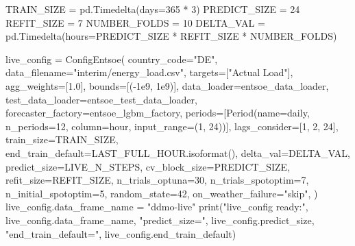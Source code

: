 \documentclass[
  english,
  letterpaper,
]{scrbook}
\newenvironment{Shaded}{\begin{snugshade}}{\end{snugshade}}
\newcommand{\BuiltInTok}[1]{\textcolor[rgb]{0.00,0.23,0.31}{#1}}
\newcommand{\DecValTok}[1]{\textcolor[rgb]{0.68,0.00,0.00}{#1}}
\newcommand{\FloatTok}[1]{\textcolor[rgb]{0.68,0.00,0.00}{#1}}
\newcommand{\NormalTok}[1]{\textcolor[rgb]{0.00,0.23,0.31}{#1}}
\newcommand{\OperatorTok}[1]{\textcolor[rgb]{0.37,0.37,0.37}{#1}}
\newcommand{\StringTok}[1]{\textcolor[rgb]{0.13,0.47,0.30}{#1}}
\begin{document}
\protect{}\label{live-config}
\begin{Shaded}
\begin{Highlighting}[]
\NormalTok{TRAIN\_SIZE }\OperatorTok{=}\NormalTok{ pd.Timedelta(days}\OperatorTok{=}\DecValTok{365} \OperatorTok{*} \DecValTok{3}\NormalTok{)}
\NormalTok{PREDICT\_SIZE }\OperatorTok{=} \DecValTok{24}
\NormalTok{REFIT\_SIZE }\OperatorTok{=} \DecValTok{7}
\NormalTok{NUMBER\_FOLDS }\OperatorTok{=} \DecValTok{10}
\NormalTok{DELTA\_VAL }\OperatorTok{=}\NormalTok{ pd.Timedelta(hours}\OperatorTok{=}\NormalTok{PREDICT\_SIZE }\OperatorTok{*}\NormalTok{ REFIT\_SIZE }\OperatorTok{*}\NormalTok{ NUMBER\_FOLDS)}

\NormalTok{live\_config }\OperatorTok{=}\NormalTok{ ConfigEntsoe(}
\NormalTok{    country\_code}\OperatorTok{=}\StringTok{"DE"}\NormalTok{,}
\NormalTok{    data\_filename}\OperatorTok{=}\StringTok{"interim/energy\_load.csv"}\NormalTok{,}
\NormalTok{    targets}\OperatorTok{=}\NormalTok{[}\StringTok{"Actual Load"}\NormalTok{],}
\NormalTok{    agg\_weights}\OperatorTok{=}\NormalTok{[}\FloatTok{1.0}\NormalTok{],}
\NormalTok{    bounds}\OperatorTok{=}\NormalTok{[(}\OperatorTok{{-}}\FloatTok{1e9}\NormalTok{, }\FloatTok{1e9}\NormalTok{)],}
\NormalTok{    data\_loader}\OperatorTok{=}\NormalTok{entsoe\_data\_loader,}
\NormalTok{    test\_data\_loader}\OperatorTok{=}\NormalTok{entsoe\_test\_data\_loader,}
\NormalTok{    forecaster\_factory}\OperatorTok{=}\NormalTok{entsoe\_lgbm\_factory,}
\NormalTok{    periods}\OperatorTok{=}\NormalTok{[Period(name}\OperatorTok{=}\StringTok{\textquotesingle{}daily\textquotesingle{}}\NormalTok{, n\_periods}\OperatorTok{=}\DecValTok{12}\NormalTok{, column}\OperatorTok{=}\StringTok{\textquotesingle{}hour\textquotesingle{}}\NormalTok{, input\_range}\OperatorTok{=}\NormalTok{(}\DecValTok{1}\NormalTok{, }\DecValTok{24}\NormalTok{))],}
\NormalTok{    lags\_consider}\OperatorTok{=}\NormalTok{[}\DecValTok{1}\NormalTok{, }\DecValTok{2}\NormalTok{, }\DecValTok{24}\NormalTok{],}
\NormalTok{    train\_size}\OperatorTok{=}\NormalTok{TRAIN\_SIZE,}
\NormalTok{    end\_train\_default}\OperatorTok{=}\NormalTok{LAST\_FULL\_HOUR.isoformat(),}
\NormalTok{    delta\_val}\OperatorTok{=}\NormalTok{DELTA\_VAL,}
\NormalTok{    predict\_size}\OperatorTok{=}\NormalTok{LIVE\_N\_STEPS,}
\NormalTok{    cv\_block\_size}\OperatorTok{=}\NormalTok{PREDICT\_SIZE,}
\NormalTok{    refit\_size}\OperatorTok{=}\NormalTok{REFIT\_SIZE,}
\NormalTok{    n\_trials\_optuna}\OperatorTok{=}\DecValTok{30}\NormalTok{,}
\NormalTok{    n\_trials\_spotoptim}\OperatorTok{=}\DecValTok{7}\NormalTok{,}
\NormalTok{    n\_initial\_spotoptim}\OperatorTok{=}\DecValTok{5}\NormalTok{,}
\NormalTok{    random\_state}\OperatorTok{=}\DecValTok{42}\NormalTok{,}
\NormalTok{    on\_weather\_failure}\OperatorTok{=}\StringTok{"skip"}\NormalTok{,}
\NormalTok{)}
\NormalTok{live\_config.data\_frame\_name }\OperatorTok{=} \StringTok{"ddmo{-}live"}
\BuiltInTok{print}\NormalTok{(}\StringTok{"live\_config ready:"}\NormalTok{, live\_config.data\_frame\_name,}
      \StringTok{"predict\_size="}\NormalTok{, live\_config.predict\_size,}
      \StringTok{"end\_train\_default="}\NormalTok{, live\_config.end\_train\_default)}
\end{Highlighting}
\end{Shaded}
\end{document}
